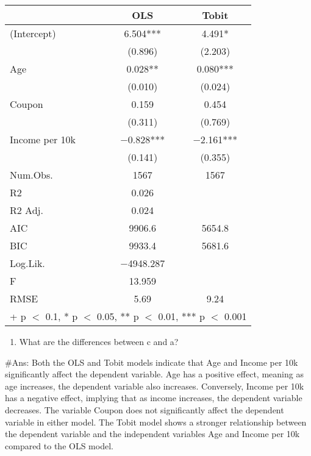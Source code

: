 \documentclass[
]{article}
\providecommand{\tightlist}{%
  \setlength{\itemsep}{0pt}\setlength{\parskip}{0pt}}
\begin{document}
\begin{table}
\centering
\begin{tabular}[t]{lcc}
\toprule
  & OLS & Tobit\\
\midrule
(Intercept) & \num{6.504}*** & \num{4.491}*\\
 & (\num{0.896}) & (\num{2.203})\\
Age & \num{0.028}** & \num{0.080}***\\
 & (\num{0.010}) & (\num{0.024})\\
Coupon & \num{0.159} & \num{0.454}\\
 & (\num{0.311}) & (\num{0.769})\\
Income per 10k & \num{-0.828}*** & \num{-2.161}***\\
 & (\num{0.141}) & (\num{0.355})\\
\midrule
Num.Obs. & \num{1567} & \num{1567}\\
R2 & \num{0.026} & \\
R2 Adj. & \num{0.024} & \\
AIC & \num{9906.6} & \num{5654.8}\\
BIC & \num{9933.4} & \num{5681.6}\\
Log.Lik. & \num{-4948.287} & \\
F & \num{13.959} & \\
RMSE & \num{5.69} & \num{9.24}\\
\bottomrule
\multicolumn{3}{l}{\rule{0pt}{1em}+ p $<$ 0.1, * p $<$ 0.05, ** p $<$ 0.01, *** p $<$ 0.001}\\
\end{tabular}
\end{table}

\begin{enumerate}
\def\labelenumi{\alph{enumi})}
\setcounter{enumi}{3}
\tightlist
\item
  What are the differences between c and a?
\end{enumerate}

\#Ans: Both the OLS and Tobit models indicate that Age and Income per
10k significantly affect the dependent variable. Age has a positive
effect, meaning as age increases, the dependent variable also increases.
Conversely, Income per 10k has a negative effect, implying that as
income increases, the dependent variable decreases. The variable Coupon
does not significantly affect the dependent variable in either model.
The Tobit model shows a stronger relationship between the dependent
variable and the independent variables Age and Income per 10k compared
to the OLS model.
\end{document}
